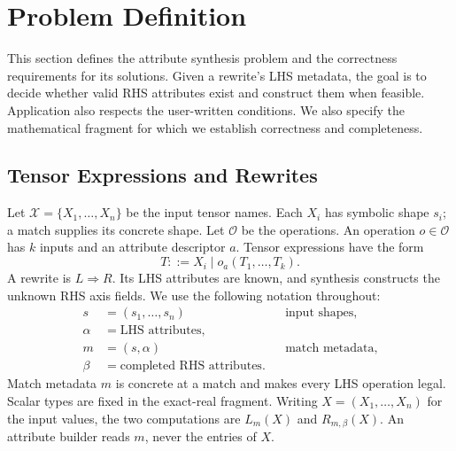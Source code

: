 \section{Problem Definition}
\label{sec:problem-definition}
This section defines the attribute synthesis problem and the correctness
requirements for its solutions. Given a rewrite's LHS metadata, the goal is
to decide whether valid RHS attributes exist and construct them when
feasible. Application also respects the user-written conditions. We also
specify the mathematical fragment for which we establish correctness and completeness.

\subsection{Tensor Expressions and Rewrites}
\label{sec:tensor-expressions-and-rewrites}
Let $\mathcal X=\{X_1,\ldots,X_n\}$ be the input tensor names. Each $X_i$ has
symbolic shape $s_i$; a match supplies its concrete shape. Let $\mathcal O$
be the operations. An operation $o\in\mathcal O$ has $k$ inputs and an
attribute descriptor $a$. Tensor expressions have the form
\begin{equation}
 T ::= X_i \mid o_a(T_1,\ldots,T_k).
\end{equation}
A rewrite is $L\Rightarrow R$. Its LHS attributes are known, and synthesis
constructs the unknown RHS axis fields. We use the following notation throughout:
\begin{equation}
\begin{aligned}
 s&=(s_1,\ldots,s_n) &&\text{input shapes},\\
 \alpha&=\text{LHS attributes},\\
 m&=(s,\alpha) &&\text{match metadata},\\
 \beta&=\text{completed RHS attributes}.
\end{aligned}
\label{eq:metadata}
\end{equation}
Match metadata $m$ is concrete at a match and makes every LHS operation legal.
Scalar types are fixed in the exact-real fragment.
Writing $X=(X_1,\ldots,X_n)$ for the input values, the two computations are
$L_m(X)$ and $R_{m,\beta}(X)$. An attribute builder reads $m$, never the
entries of $X$.


